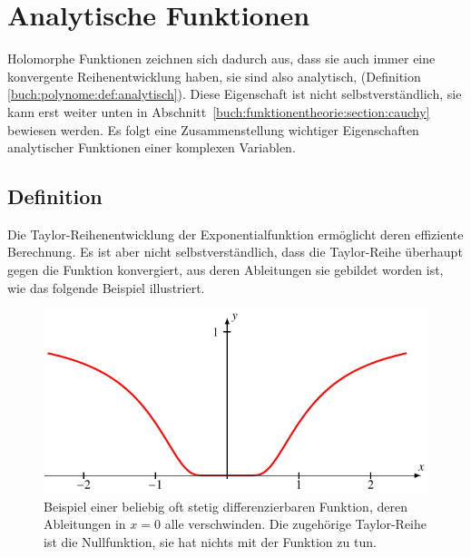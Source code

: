%
%
%
\section{Analytische Funktionen
\label{buch:funktionentheorie:section:analytisch}}
Holomorphe Funktionen zeichnen sich dadurch aus, dass sie auch immer
eine konvergente Reihenentwicklung haben, sie sind also analytisch,
(Definition \ref{buch:polynome:def:analytisch}).
%
Diese Eigenschaft ist nicht selbstverständlich, sie kann erst
weiter unten in Abschnitt~\ref{buch:funktionentheorie:section:cauchy}
bewiesen werden.
Es folgt eine Zusammenstellung wichtiger Eigenschaften analytischer
Funktionen einer komplexen Variablen.

%
%
\subsection{Definition}
%
%
Die Taylor-Reihenentwicklung der Exponentialfunktion ermöglicht deren
effiziente Berechnung.
Es ist aber nicht selbstverständlich, dass die Taylor-Reihe überhaupt
gegen die Funktion konvergiert, aus deren Ableitungen sie gebildet
worden ist, wie das folgende Beispiel illustriert.

\begin{figure}
\centering
\includegraphics{chapters/080-funktionentheorie/images/nonanalytic.pdf}
\caption{Beispiel einer beliebig oft stetig differenzierbaren Funktion,
deren Ableitungen in $x=0$ alle verschwinden.
Die zugehörige Taylor-Reihe ist die Nullfunktion, sie hat nichts mit der
Funktion zu tun.
\label{buch:funktionentheorie:fig:nonanalytic}}
\end{figure}


